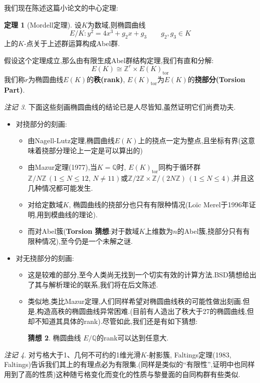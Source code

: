 \documentclass[12pt,A4paper,oneside,reqno]{amsart}
\numberwithin{equation}{section}
\theoremstyle{definition}
\newtheorem{theorem}{定理}[section]
\newtheorem{conj}[theorem]{猜想}
\theoremstyle{plain}
\theoremstyle{plain}
\numberwithin{equation}{section}
\theoremstyle{remark}
\newtheorem{remark}[theorem]{注记}
\DeclareMathOperator{\tor}{\operatorname{tor}}
\begin{document}
我们现在陈述这篇小论文的中心定理:
\begin{theorem}[Mordell定理]
	设$K$为数域,则椭圆曲线$$E/K:y^2=4x^3+g_2x+g_3 \qquad g_2,g_3 \in K$$
	上的$K$-点关于上述群运算构成Abel群.
\end{theorem}
假设这个定理成立,那么由有限生成Abel群结构定理,我们有直和分解:
$$E(K) \cong \mathbb{Z}^{r} \times E(K)_{\tor}$$
我们称$r$为椭圆曲线$E(K)$的\textbf{秩(rank)}, $E(K)_{\tor}$为$E(K)$的\textbf{挠部分(Torsion Part)}.
\begin{remark}
	下面这些刻画椭圆曲线的结论已是人尽皆知,虽然证明它们尚费功夫.
	\begin{itemize}
		\item 对挠部分的刻画:
		\begin{itemize}
			\item 由Nagell-Lutz定理,椭圆曲线$E(K)$上的挠点一定为整点,且坐标有界(这意味着挠部分理论上一定是可以算出的)
			\item 由Mazur定理(1977),当$K=\mathbb{Q}$时, $E(K)_{\tor}$同构于循环群$\mathbb{Z}/N\mathbb{Z}\,(1 \leqslant N \leqslant 12,\, N \neq 11)$或$\mathbb{Z}/2\mathbb{Z} \times \mathbb{Z}/(2N\mathbb{Z}) \,(1 \leqslant N \leqslant 4)$,并且这几种情况都可能发生.
			\item []对给定数域$K$, 椭圆曲线的挠部分也只有有限种情况(Lo\"{i}c Merel于1996年证明,用到模曲线的理论).
			\item []而对Abel簇(\textbf{Torsion 猜想}:对于数域$K$上维数为$n$的Abel簇,挠部分只有有限种情况),至今仍是一个未解之谜.
		\end{itemize}
	\item 对无挠部分的刻画:
	\begin{itemize}
		\item 这是较难的部分,至今人类尚无找到一个切实有效的计算方法.BSD猜想给出了其与解析理论的联系,我们将在后文陈述.
		\item 类似地,类比Mazur定理,人们同样希望对椭圆曲线秩的可能性做出刻画.但是,构造高秩的椭圆曲线异常困难.(目前有人造出了秩大于27的椭圆曲线,但却不知道其具体的rank).尽管如此,我们还是有如下猜想:
		\begin{conj}
			椭圆曲线 $E/\mathbb{Q}$的rank可以达到任意大.
		\end{conj}
	\end{itemize}
	\end{itemize}
\end{remark}
\begin{remark}
	对亏格大于1、几何不可约的1维光滑$K$-射影簇, Faltings定理(1983, Faltings)告诉我们其上的有理点必为有限集.(同样是类似的“有限性”,证明中也同样用到了高的性质)这种随亏格变化而变化的性质与黎曼面的自同构群有些类似.
\end{remark}
\end{document}
